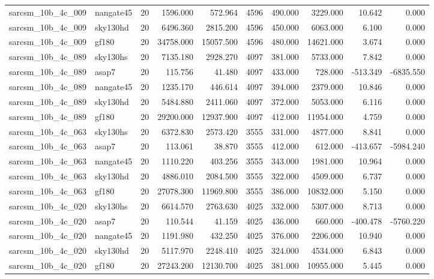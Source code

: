 \begin{tabular}{llrrrrrrrr}
sarcsm\_10b\_4c\_009 & nangate45 & 20 & 1596.000 & 572.964 & 4596 & 490.000 & 3229.000 & 10.642 & 0.000 \\
sarcsm\_10b\_4c\_009 & sky130hd & 20 & 6496.360 & 2815.200 & 4596 & 450.000 & 6063.000 & 6.100 & 0.000 \\
sarcsm\_10b\_4c\_009 & gf180 & 20 & 34758.000 & 15057.500 & 4596 & 480.000 & 14621.000 & 3.674 & 0.000 \\
sarcsm\_10b\_4c\_089 & sky130hs & 20 & 7135.180 & 2928.270 & 4097 & 381.000 & 5733.000 & 7.842 & 0.000 \\
sarcsm\_10b\_4c\_089 & asap7 & 20 & 115.756 & 41.480 & 4097 & 433.000 & 728.000 & -513.349 & -6835.550 \\
sarcsm\_10b\_4c\_089 & nangate45 & 20 & 1235.170 & 446.614 & 4097 & 394.000 & 2379.000 & 10.846 & 0.000 \\
sarcsm\_10b\_4c\_089 & sky130hd & 20 & 5484.880 & 2411.060 & 4097 & 372.000 & 5053.000 & 6.116 & 0.000 \\
sarcsm\_10b\_4c\_089 & gf180 & 20 & 29200.000 & 12937.900 & 4097 & 412.000 & 11954.000 & 4.759 & 0.000 \\
sarcsm\_10b\_4c\_063 & sky130hs & 20 & 6372.830 & 2573.420 & 3555 & 331.000 & 4877.000 & 8.841 & 0.000 \\
sarcsm\_10b\_4c\_063 & asap7 & 20 & 113.061 & 38.870 & 3555 & 412.000 & 612.000 & -413.657 & -5984.240 \\
sarcsm\_10b\_4c\_063 & nangate45 & 20 & 1110.220 & 403.256 & 3555 & 343.000 & 1981.000 & 10.964 & 0.000 \\
sarcsm\_10b\_4c\_063 & sky130hd & 20 & 4886.010 & 2084.500 & 3555 & 322.000 & 4509.000 & 6.737 & 0.000 \\
sarcsm\_10b\_4c\_063 & gf180 & 20 & 27078.300 & 11969.800 & 3555 & 386.000 & 10832.000 & 5.150 & 0.000 \\
sarcsm\_10b\_4c\_020 & sky130hs & 20 & 6614.570 & 2763.630 & 4025 & 332.000 & 5307.000 & 8.713 & 0.000 \\
sarcsm\_10b\_4c\_020 & asap7 & 20 & 110.544 & 41.159 & 4025 & 436.000 & 660.000 & -400.478 & -5760.220 \\
sarcsm\_10b\_4c\_020 & nangate45 & 20 & 1191.980 & 432.250 & 4025 & 376.000 & 2206.000 & 10.940 & 0.000 \\
sarcsm\_10b\_4c\_020 & sky130hd & 20 & 5117.970 & 2248.410 & 4025 & 324.000 & 4534.000 & 6.843 & 0.000 \\
sarcsm\_10b\_4c\_020 & gf180 & 20 & 27243.200 & 12130.700 & 4025 & 381.000 & 10955.000 & 5.445 & 0.000 \\

\end{tabular}
